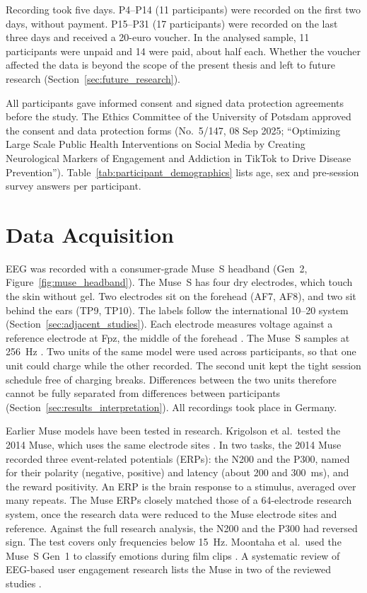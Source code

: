 \documentclass[12pt,a4paper]{report}
\begin{document}
Recording took five days. P4--P14 (11 participants) were recorded on the first two days, without payment. P15--P31 (17 participants) were recorded on the last three days and received a 20-euro voucher. In the analysed sample, 11 participants were unpaid and 14 were paid, about half each. Whether the voucher affected the data is beyond the scope of the present thesis and left to future research (Section~\ref{sec:future_research}).

All participants gave informed consent and signed data protection agreements before the study. The Ethics Committee of the University of Potsdam approved the consent and data protection forms (No.\ 5/147, 08 Sep 2025; ``Optimizing Large Scale Public Health Interventions on Social Media by Creating Neurological Markers of Engagement and Addiction in TikTok to Drive Disease Prevention''). Table~\ref{tab:participant_demographics} lists age, sex and pre-session survey answers per participant.




\section{Data Acquisition}
\label{sec:method_data_acquisition}
EEG was recorded with a consumer-grade Muse~S headband (Gen~2, Figure~\ref{fig:muse_headband}). The Muse~S has four dry electrodes, which touch the skin without gel. Two electrodes sit on the forehead (AF7, AF8), and two sit behind the ears (TP9, TP10). The labels follow the international 10--20 system (Section~\ref{sec:adjacent_studies}). Each electrode measures voltage against a reference electrode at Fpz, the middle of the forehead \cite{moontaha_online_2023-1}. The Muse~S samples at 256~Hz \cite{rahman_detection_2025}. Two units of the same model were used across participants, so that one unit could charge while the other recorded. The second unit kept the tight session schedule free of charging breaks. Differences between the two units therefore cannot be fully separated from differences between participants (Section~\ref{sec:results_interpretation}). All recordings took place in Germany.

Earlier Muse models have been tested in research. Krigolson et al.\ tested the 2014 Muse, which uses the same electrode sites \cite{krigolson_choosing_2017}. In two tasks, the 2014 Muse recorded three event-related potentials (ERPs): the N200 and the P300, named for their polarity (negative, positive) and latency (about 200 and 300~ms), and the reward positivity. An ERP is the brain response to a stimulus, averaged over many repeats. The Muse ERPs closely matched those of a 64-electrode research system, once the research data were reduced to the Muse electrode sites and reference. Against the full research analysis, the N200 and the P300 had reversed sign. The test covers only frequencies below 15~Hz. Moontaha et al.\ used the Muse~S Gen~1 to classify emotions during film clips \cite{moontaha_online_2023-1}. A systematic review of EEG-based user engagement research lists the Muse in two of the reviewed studies \cite{bellos_methods_2025}.
\end{document}
